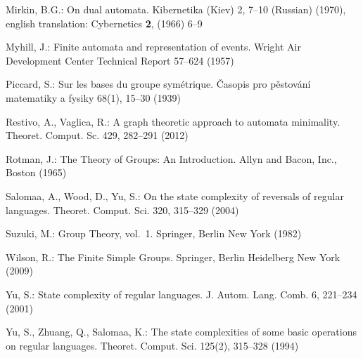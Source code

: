 \documentclass{llncs}
\begin{document}
\begin{thebibliography}{10}
Mirkin, B.G.: On dual automata. Kibernetika (Kiev)  2,  7--10 (Russian) (1970),
  english translation: Cybernetics {\bf 2}, (1966) 6--9

Myhill, J.: Finite automata and representation of events. Wright Air
  Development Center Technical Report  57--624 (1957)

Piccard, S.: Sur les bases du groupe sym\'etrique. \v{C}asopis pro
  p\v{e}stov\'an\'i matematiky a fysiky  68(1),  15--30 (1939)

Restivo, A., Vaglica, R.: A graph theoretic approach to automata minimality.
  Theoret. Comput. Sc.  429,  282--291 (2012)

Rotman, J.: The Theory of Groups: An Introduction. Allyn and Bacon, Inc.,
  Boston (1965)

Salomaa, A., Wood, D., Yu, S.: On the state complexity of reversals of regular
  languages. Theoret. Comput. Sci.  320,  315--329 (2004)

Suzuki, M.: Group Theory, vol.~1. Springer, Berlin New York (1982)

Wilson, R.: The Finite Simple Groups. Springer, Berlin Heidelberg New York
  (2009)

Yu, S.: State complexity of regular languages. J. Autom. Lang. Comb.  6,
  221--234 (2001)

Yu, S., Zhuang, Q., Salomaa, K.: The state complexities of some basic
  operations on regular languages. Theoret. Comput. Sci.  125(2),  315--328
  (1994)

\end{thebibliography}
\end{document}
